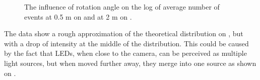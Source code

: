 \begin{figure}[H]
	\centering
	\caption{
  The influence of rotation angle on the log of average number of events at 0.5 m on  and at 2 m on .
  }
	\label{fig:angles}
\end{figure}
The data show a rough approximation of the theoretical distribution on ,
but with a drop of intensity at the middle of the distribution. This could be caused
by the fact that LEDs, when close to the camera, can be perceived as multiple light sources,
but when moved further away, they merge into one source as shown on .

